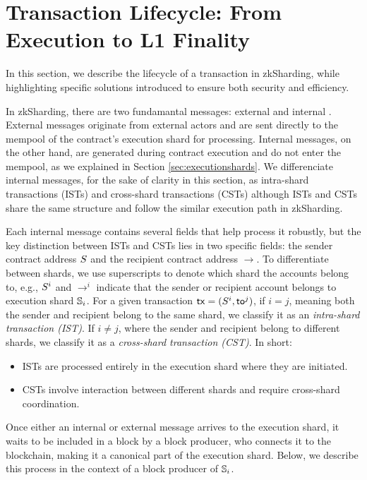 \section{Transaction Lifecycle: From Execution to L1 Finality}
\label{sec:txlifecycle}

In this section, we describe the lifecycle of a transaction in zkSharding,
while highlighting specific solutions introduced to ensure both security
and efficiency.

In zkSharding, there are two fundamantal messages: external and internal
.  External messages originate from
external actors and are sent directly to the mempool of the contract’s
execution shard for processing. Internal messages, on the other hand, are
generated during contract execution and do not enter the mempool, as we
explained in Section \ref{sec:executionshards}. We differenciate internal
messages, for the sake of clarity in this section, as intra-shard
transactions (ISTs) and cross-shard transactions (CSTs) although ISTs and
CSTs share  the same structure and follow the similar execution path in
zkSharding.

Each internal message contains several fields that help process it
robustly,
but the key distinction between ISTs and CSTs lies in two specific fields:
the sender contract address $S$ and  the recipient contract address
$\to$.	To differentiate between shards, we use superscripts to denote
which shard the accounts belong to, e.g.,  $S^i$ and $\to^i$
indicate that  the sender or recipient account belongs to execution shard
$\mathbb{S}_i$.
For a given transaction $\mathsf{tx} = (S^i, \mathsf{to}^j)$, if $i = j$, meaning
both the sender and recipient belong to the same shard, we classify it as
an \emph{intra-shard transaction (IST)}. If $i \neq j$, where the sender
and recipient belong to different shards, we classify it as a
\emph{cross-shard transaction (CST)}. In short:
\begin{itemize}
	\item ISTs are processed entirely in the execution shard where
	      they are initiated.
	\item CSTs involve interaction between different shards and
	      require cross-shard coordination.
\end{itemize}

Once either an internal or external message arrives to the execution
shard, it waits to be included in a block by a
block producer, who connects it to the blockchain, making it a canonical
part of the execution shard. Below, we describe this process in the
context of a block producer of $\mathbb{S}_i$.

